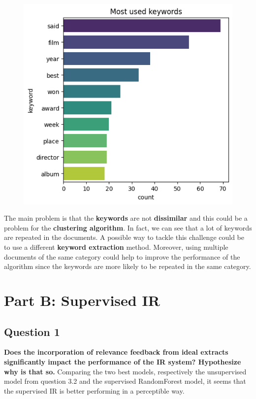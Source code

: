 \begin{figure}[H]
\begin{minipage}{.5\textwidth}
    \includegraphics[width=1\linewidth]{images/keyword_distribution_ranks.png}
    \label{fig:question4_2}
  \end{minipage}
\end{figure}

The main problem is that the \textbf{keywords} are not \textbf{dissimilar} and
this could be a problem for the \textbf{clustering algorithm}. In fact, we can
see that a lot of keywords are repeated in the documents. A possible way to
tackle this challenge could be to use a different \textbf{keyword extraction} method. Moreover, using multiple documents of the same
category could help to improve the performance of the algorithm since the
keywords are more likely to be repeated in the same category.

\section*{Part B: Supervised IR}
\subsection{Question 1}
\textbf{ Does the incorporation of relevance feedback from ideal extracts significantly impact the performance of the IR system? Hypothesize why is that so.}
Comparing the two best models, respectively the unsupervised model from question 3.2 and the supervised RandomForest model, it seems that the supervised IR is better performing in a perceptible way. 


